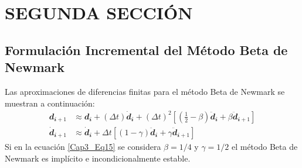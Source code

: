 \section{SEGUNDA SECCIÓN}
	
	\subsection{Formulación Incremental del Método Beta de Newmark}

Las aproximaciones de diferencias finitas para el método Beta de Newmark se muestran a continuación:
\begin{subequations}\label{Cap3_Eq15}
  \begin{align}
\mathbfit{d_{i+1}}&\approx \mathbfit{d_{i}}+(\Delta t) \mathbfit{\dot{d}_{i}}+(\Delta t)^2\left[\left(\frac{1}{2}-\beta\right)\mathbfit{\ddot{d}_{i}}+\beta\mathbfit{\ddot{d}_{i+1}} \right]		\label{Cap3_Eq15_1} \\[2 mm]
\mathbfit{\dot{d}_{i+1}}&\approx \mathbfit{\dot{d}_{i}}+\Delta t\left [(1-\gamma)\mathbfit{\ddot{d}_{i}}+\gamma\mathbfit{\ddot{d}_{i+1}}\right] \label{Cap3_Eq15_2}
  \end{align}
\end{subequations}
Si en la ecuación \ref{Cap3_Eq15} se considera $\beta=1/4$ y $\gamma=1/2$ el método Beta de Newmark es implícito e incondicionalmente estable. 






